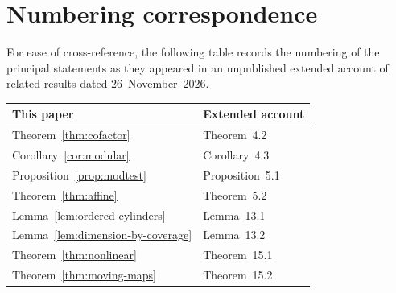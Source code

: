 \documentclass[11pt,reqno,a4paper]{amsart}
\theoremstyle{remark}
\begin{document}
\section*{Numbering correspondence}
For ease of cross-reference, the following table records the numbering of the principal statements as they appeared in an unpublished extended account of related results dated 26~November~2026.
\begin{center}
\begin{tabular}{@{}ll@{}}
\toprule
This paper & Extended account \\
\midrule
Theorem~\ref{thm:cofactor} & Theorem~4.2 \\
Corollary~\ref{cor:modular} & Corollary~4.3 \\
Proposition~\ref{prop:modtest} & Proposition~5.1 \\
Theorem~\ref{thm:affine} & Theorem~5.2 \\
Lemma~\ref{lem:ordered-cylinders} & Lemma~13.1 \\
Lemma~\ref{lem:dimension-by-coverage} & Lemma~13.2 \\
Theorem~\ref{thm:nonlinear} & Theorem~15.1 \\
Theorem~\ref{thm:moving-maps} & Theorem~15.2 \\
\bottomrule
\end{tabular}
\end{center}
\end{document}

